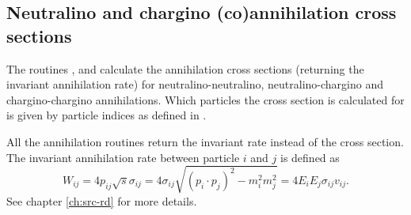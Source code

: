 \subsection{Neutralino and chargino (co)annihilation cross sections}
                                   
The routines ,  and 
calculate the annihilation cross sections (returning the invariant 
annihilation rate) for neutralino-neutralino, neutralino-chargino and
chargino-chargino annihilations. Which particles the cross section is
calculated for is given by particle indices as defined in .

All the annihilation routines return the invariant rate instead of the
cross section. The invariant annihilation rate between particle $i$
and $j$ is defined as 
\begin{equation}
  W_{ij} = 4 p_{ij} \sqrt{s} \sigma_{ij} = 4 \sigma_{ij} \sqrt{(p_i
\cdot p_j)^2 - m_i^2 m_j^2} = 4 E_{i} E_{j} \sigma_{ij} v_{ij} .
\end{equation}
See chapter \ref{ch:src-rd} for more details.
